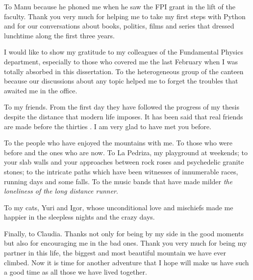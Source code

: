 \documentclass[b5paper,openright,10pt]{book}
\begin{document}
To Manu because he phoned me when he saw the FPI grant in the lift of the faculty. Thank you very much for helping me to take my first steps with Python and for our conversations about books, politics, films and series that dressed lunchtime along the first three years.

I would like to show my gratitude to my colleagues of the Fundamental Physics department, especially to those who covered me the last February when I was totally absorbed in this dissertation. To the heterogeneous group of the canteen because our discussions about any topic helped me to forget the troubles that awaited me in the office. 

To my friends. From the first day they have followed the progress of my thesis despite the distance that modern life imposes. It has been said that real friends are made before the thirties \cite{Llaneras2018}. I am very glad to have met you before. 

To the people who have enjoyed the mountains with me. To those who were before and the ones who are now. To La Pedriza, my playground at weekends; to your slab walls and your approaches between rock roses and psychedelic granite stones; to the intricate paths which have been witnesses of innumerable races, running days and some falls. To the music bands that have made milder {\it the loneliness of the long distance runner}. 

To my cats, Yuri and Igor, whose unconditional love and mischiefs made me happier in the sleepless nights and the crazy days. 

Finally, to Claudia. Thanks not only for being by my side in the good moments but also for encouraging me in the bad ones. Thank you very much for being my partner in this life, the biggest and most beautiful mountain we have ever climbed. Now it is time for another adventure that I hope will make us have such a good time as all those we have lived together. 


\pagestyle{Contents}  %
\tableofcontents %
\end{document}
